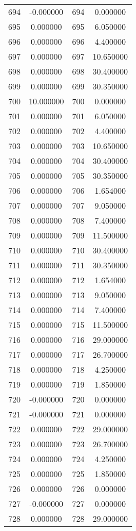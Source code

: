 \documentclass[12pt]{article}
\begin{document}
\begin{longtable}{@{}cccc@{}}
694 & -0.000000 & 694 & 0.000000 \\
695 & 0.000000 & 695 & 6.050000 \\
696 & 0.000000 & 696 & 4.400000 \\
697 & 0.000000 & 697 & 10.650000 \\
698 & 0.000000 & 698 & 30.400000 \\
699 & 0.000000 & 699 & 30.350000 \\
700 & 10.000000 & 700 & 0.000000 \\
701 & 0.000000 & 701 & 6.050000 \\
702 & 0.000000 & 702 & 4.400000 \\
703 & 0.000000 & 703 & 10.650000 \\
704 & 0.000000 & 704 & 30.400000 \\
705 & 0.000000 & 705 & 30.350000 \\
706 & 0.000000 & 706 & 1.654000 \\
707 & 0.000000 & 707 & 9.050000 \\
708 & 0.000000 & 708 & 7.400000 \\
709 & 0.000000 & 709 & 11.500000 \\
710 & 0.000000 & 710 & 30.400000 \\
711 & 0.000000 & 711 & 30.350000 \\
712 & 0.000000 & 712 & 1.654000 \\
713 & 0.000000 & 713 & 9.050000 \\
714 & 0.000000 & 714 & 7.400000 \\
715 & 0.000000 & 715 & 11.500000 \\
716 & 0.000000 & 716 & 29.000000 \\
717 & 0.000000 & 717 & 26.700000 \\
718 & 0.000000 & 718 & 4.250000 \\
719 & 0.000000 & 719 & 1.850000 \\
720 & -0.000000 & 720 & 0.000000 \\
721 & -0.000000 & 721 & 0.000000 \\
722 & 0.000000 & 722 & 29.000000 \\
723 & 0.000000 & 723 & 26.700000 \\
724 & 0.000000 & 724 & 4.250000 \\
725 & 0.000000 & 725 & 1.850000 \\
726 & 0.000000 & 726 & 0.000000 \\
727 & -0.000000 & 727 & 0.000000 \\
728 & 0.000000 & 728 & 29.000000 \\

\end{longtable}
\end{document}
